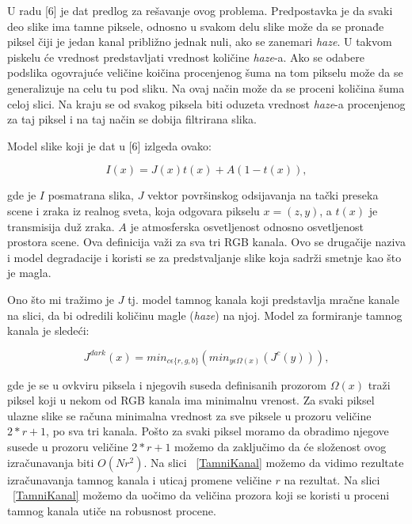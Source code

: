 \documentclass[a4paper,12pt,titlepage]{article}
\begin{document}
U radu [6] je dat predlog za rešavanje ovog problema. Predpostavka je da svaki deo slike ima tamne piksele, odnosno u svakom delu slike može da se pronađe piksel čiji je jedan kanal približno jednak nuli, ako se zanemari \emph{haze}. U takvom piskelu će vrednost predstavljati vrednost količine \emph{haze}-a. Ako se odabere podslika ogovrajuće veličine koičina procenjenog šuma na tom pikselu može da se generalizuje na celu tu pod sliku. Na ovaj način može da se proceni količina šuma celoj slici. Na kraju se od svakog piksela biti oduzeta vrednost \emph{haze}-a procenjenog za taj piksel i na taj način se dobija filtrirana slika.

Model slike koji je dat u [6] izlgeda ovako:

\begin{equation}\label{eq:haze1}
I(x) = J(x)t(x) + A(1 - t(x)),
\end{equation}

gde je $I$ posmatrana slika, $J$ vektor površinskog odsijavanja na tački preseka scene i zraka iz realnog sveta, koja odgovara pikselu $x = (z, y)$, a $t(x)$ je transmisija duž zraka. $A$ je atmosferska osvetljenost odnosno osvetljenost prostora scene. Ova definicija važi za sva tri RGB kanala. Ovo se drugačije naziva i model degradacije i koristi se za predstvaljanje slike koja sadrži smetnje kao što je magla.   

Ono što mi tražimo je $J$ tj. model tamnog kanala koji predstavlja mračne kanale na slici, da bi odredili količinu magle (\emph{haze}) na njoj. Model za formiranje tamnog kanala je sledeći:

\begin{equation}\label{eq:haze2}
J^{dark}(x) = min_{c \epsilon \{r, g, b \}}( min_{y \epsilon \Omega (x)} (J^c (y)) ),
\end{equation}

gde je se u ovkviru piksela i njegovih suseda definisanih prozorom $\Omega(x)$ traži piksel koji u nekom od RGB kanala ima minimalnu vrenost. Za svaki piksel ulazne slike se računa minimalna vrednost za sve piksele u prozoru veličine $2*r + 1$, po sva tri kanala. Pošto za svaki piksel moramo da obradimo njegove susede u prozoru veličine $2*r + 1$ možemo da zaključimo da će složenost ovog izračunavanja biti $O(Nr^2)$. Na slici ~\ref{TamniKanal} možemo da vidimo rezultate izračunavanja tamnog kanala i uticaj promene veličine $r$ na rezultat. Na slici ~\ref{TamniKanal} možemo da uočimo da veličina prozora koji se koristi u proceni tamnog kanala utiče na robusnost procene. 
\end{document}
